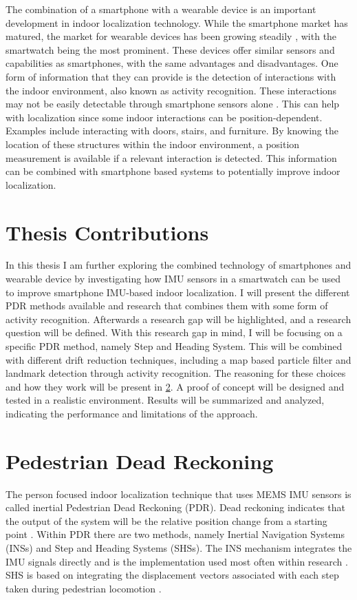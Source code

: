 The combination of a smartphone with a wearable device is an important development in indoor localization technology. While the smartphone market has matured, the market for wearable devices has been growing steadily \cite{jung2016consumer}, with the smartwatch being the most prominent. These devices offer similar sensors and capabilities as smartphones, with the same advantages and disadvantages. One form of information that they can provide is the detection of interactions with the indoor environment, also known as activity recognition. These interactions may not be easily detectable through smartphone sensors alone \cite{Shoaib2015}. This can help with localization since some indoor interactions can be position-dependent. Examples include interacting with doors, stairs, and furniture. By knowing the location of these structures within the indoor environment, a position measurement is available if a relevant interaction is detected. This information can be combined with smartphone based systems to potentially improve indoor localization.

\section{Thesis Contributions}

In this thesis I am further exploring the combined technology of smartphones and wearable device by investigating how IMU sensors in a smartwatch can be used to improve smartphone IMU-based indoor localization. I will present the different \ac{PDR} methods available and research that combines them with some form of activity recognition. Afterwards a research gap will be highlighted, and a research question will be defined. With this research gap in mind, I will be focusing on a specific \ac{PDR} method, namely Step and Heading System. This will be combined with different drift reduction techniques, including a map based particle filter and landmark detection through activity recognition. The reasoning for these choices and how they work will be present in  \cref{sec:relevant_research}. A proof of concept will be designed and tested in a realistic environment. Results will be summarized and analyzed, indicating the performance and  limitations of the approach.

\section{Pedestrian Dead Reckoning }
\label{sec:relevant_research}
The person focused indoor localization technique that uses MEMS IMU sensors is called inertial Pedestrian Dead Reckoning (PDR). Dead reckoning indicates that the output of the system will be the relative position change from a starting point \cite{Yu2018}. Within PDR there are two methods, namely Inertial Navigation Systems (INSs) and Step and Heading Systems (SHSs). The INS mechanism integrates the IMU signals directly and is the implementation used most often within research \cite{Diez2018b}. SHS is based on integrating the displacement vectors associated with each step taken during pedestrian locomotion \cite{Davidson2017}.  \par

